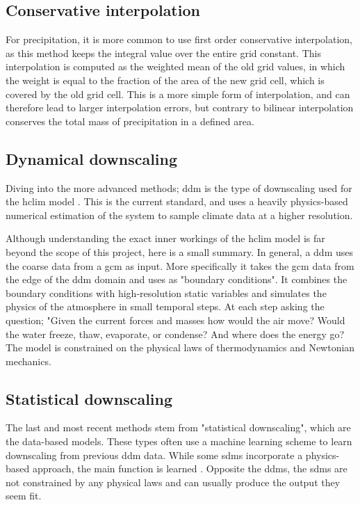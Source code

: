 \subsection{Conservative interpolation}

For precipitation, it is more common to use first order conservative interpolation, as this method keeps the integral value over the entire grid constant. This interpolation is computed as the weighted mean of the old grid values, in which the weight is equal to the fraction of the area of the new grid cell, which is covered by the old grid cell. This is a more simple form of interpolation, and can therefore lead to larger interpolation errors, but contrary to bilinear interpolation conserves the total mass of precipitation in a defined area.

\subsection{Dynamical downscaling}

Diving into the more advanced methods; \gls{ddm} is the type of \gls{downscaling} used for the \gls{hclim} model \cite{hclim}. This is the current standard, and uses a heavily physics-based numerical estimation of the system to sample climate data at a higher resolution.

Although understanding the exact inner workings of the \gls{hclim} model is far beyond the scope of this project, here is a small summary. 
In general, a \gls{ddm} uses the coarse data from a \gls{gcm} as input. More specifically it takes the \gls{gcm} data from the edge of the \gls{ddm} domain and uses as "boundary conditions". It combines the boundary conditions with high-resolution static variables and simulates the physics of the atmosphere in small temporal steps. At each step asking the question; "Given the current forces and masses how would the air move? Would the water freeze, thaw, evaporate, or condense? And where does the energy go? The model is constrained on the physical laws of thermodynamics and Newtonian mechanics. 

\subsection{Statistical downscaling}

The last and most recent methods stem from "statistical \gls{downscaling}", which are the data-based models. These types often use a machine learning scheme to learn \gls{downscaling} from previous \gls{ddm} data. While some \glspl{sdm} incorporate a physics-based approach, the main function is learned \cite{marie}. Opposite the \glspl{ddm}, the \glspl{sdm} are not constrained by any physical laws and can usually produce the output they seem fit.

